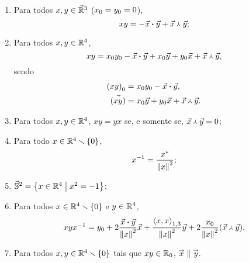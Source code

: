 \begin{proposition}
	\begin{enumerate}
	\item Para todos $x,y \in \vec{\mathbb{R}}^3$ (${x}_0 = {y}_0 = 0$),
		\begin{equation*}
		xy = - {\vec{x}} \bm{\cdot} {\vec{y}} + {\vec{x}} \Yup {\vec{y}};
		\end{equation*}
	\item Para todos $x,y \in \mathbb{R}^4$,
		\begin{equation*}
		xy = {x}_0{y}_0 - {\vec{x}} \bm{\cdot} {\vec{y}} + {x}_0\vec{y} + {y}_0\vec{x} + {\vec{x}} \Yup {\vec{y}},
		\end{equation*}
sendo
		\begin{align*}
		{(xy)}_0 &= {x}_0{y}_0 - {\vec{x}} \bm{\cdot} {\vec{y}}, \\
		\vec{(xy)} &= {x}_0\vec{y} + {y}_0\vec{x} + {\vec{x}} \Yup {\vec{y}}.
		\end{align*}

	\item Para todos $x,y \in \mathbb{R}^4$, $xy=yx$ se, e somente se, ${\vec{x}} \Yup {\vec{y}}=0$;%

	\item Para todo $x \in \mathbb{R}^4 \smallsetminus \{0\}$,
		\begin{equation*}
		x^{-1} = \frac{{x}^{\ast}}{\left\Vert{x}\right\Vert^2};
		\end{equation*}

	\item $\vec{\mathbb{S}}^2 = \left\{ x \in \mathbb{R}^4 \;\middle\vert\; x^2 = -1 \right\}$;

	\item Para todos $x \in \mathbb{R}^4 \smallsetminus \{0\}$ e $y \in \mathbb{R}^4$,
		\begin{equation*}
		xyx^{-1} = {y}_0 + 2\frac{{\vec{x}} \bm{\cdot} {\vec{y}}}{\left\Vert{x}\right\Vert^2}\vec{x} + \frac{\left\langle{x},{x}\right\rangle_{1,3}}{\left\Vert{x}\right\Vert^2}\vec{y} + 2\frac{{x}_0}{\left\Vert{x}\right\Vert^2}({\vec{x}} \Yup {\vec{y}}).
		\end{equation*}

	\item Para todos $x,y \in \mathbb{R}^4 \smallsetminus \{0\}$ tais que $xy \in {\mathbb{R}}_0$, %
	 $\vec{x} \parallel \vec{y}$.
	\end{enumerate}
\end{proposition}
